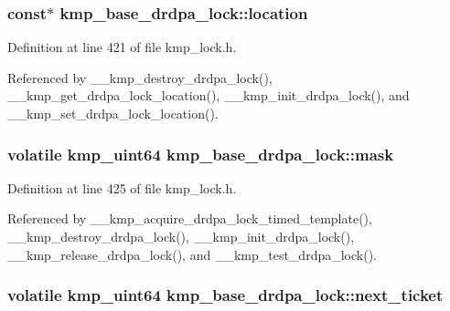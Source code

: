 \hypertarget{structkmp__base__drdpa__lock_aab9a244dfedf0a444df2955caff8ea7f}{
\subsubsection[{location}]{ const$\ast$ kmp\-\_\-base\-\_\-drdpa\-\_\-lock\-::location}}\label{structkmp__base__drdpa__lock_aab9a244dfedf0a444df2955caff8ea7f}


Definition at line 421 of file kmp\-\_\-lock.\-h.



Referenced by \-\_\-\-\_\-kmp\-\_\-destroy\-\_\-drdpa\-\_\-lock(), \-\_\-\-\_\-kmp\-\_\-get\-\_\-drdpa\-\_\-lock\-\_\-location(), \-\_\-\-\_\-kmp\-\_\-init\-\_\-drdpa\-\_\-lock(), and \-\_\-\-\_\-kmp\-\_\-set\-\_\-drdpa\-\_\-lock\-\_\-location().

\hypertarget{structkmp__base__drdpa__lock_acec09bcec7dbfc7df0ed9a06e61f3bcf}{
\subsubsection[{mask}]{\setlength{\rightskip}{0pt plus 5cm}volatile kmp\-\_\-uint64 kmp\-\_\-base\-\_\-drdpa\-\_\-lock\-::mask}}\label{structkmp__base__drdpa__lock_acec09bcec7dbfc7df0ed9a06e61f3bcf}


Definition at line 425 of file kmp\-\_\-lock.\-h.



Referenced by \-\_\-\-\_\-kmp\-\_\-acquire\-\_\-drdpa\-\_\-lock\-\_\-timed\-\_\-template(), \-\_\-\-\_\-kmp\-\_\-destroy\-\_\-drdpa\-\_\-lock(), \-\_\-\-\_\-kmp\-\_\-init\-\_\-drdpa\-\_\-lock(), \-\_\-\-\_\-kmp\-\_\-release\-\_\-drdpa\-\_\-lock(), and \-\_\-\-\_\-kmp\-\_\-test\-\_\-drdpa\-\_\-lock().

\hypertarget{structkmp__base__drdpa__lock_ad785a638373622c2eb3fb47dc9da66ce}{
\subsubsection[{next\-\_\-ticket}]{ volatile kmp\-\_\-uint64 kmp\-\_\-base\-\_\-drdpa\-\_\-lock\-::next\-\_\-ticket}}\label{structkmp__base__drdpa__lock_ad785a638373622c2eb3fb47dc9da66ce}


